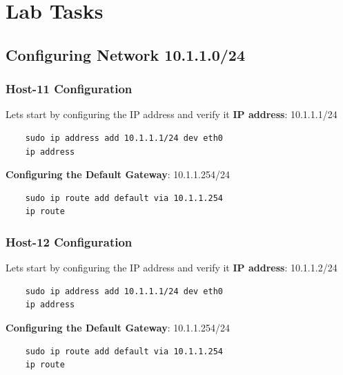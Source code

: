 \section{Lab Tasks}
\subsection{Configuring Network 10.1.1.0/24}

\subsubsection{Host-11 Configuration}
Lets start by configuring the IP address and verify it
\textbf{IP address}: 10.1.1.1/24

\begin{verbatim}
    sudo ip address add 10.1.1.1/24 dev eth0
    ip address
\end{verbatim}

\textbf{Configuring the Default Gateway}: 10.1.1.254/24
\begin{verbatim}
    sudo ip route add default via 10.1.1.254
    ip route
\end{verbatim}

\subsubsection{Host-12 Configuration}
Lets start by configuring the IP address and verify it
\newline
\newline
\textbf{IP address}: 10.1.1.2/24

\begin{verbatim}
    sudo ip address add 10.1.1.1/24 dev eth0
    ip address
\end{verbatim}

\textbf{Configuring the Default Gateway}: 10.1.1.254/24

\begin{verbatim}
    sudo ip route add default via 10.1.1.254
    ip route
\end{verbatim}

